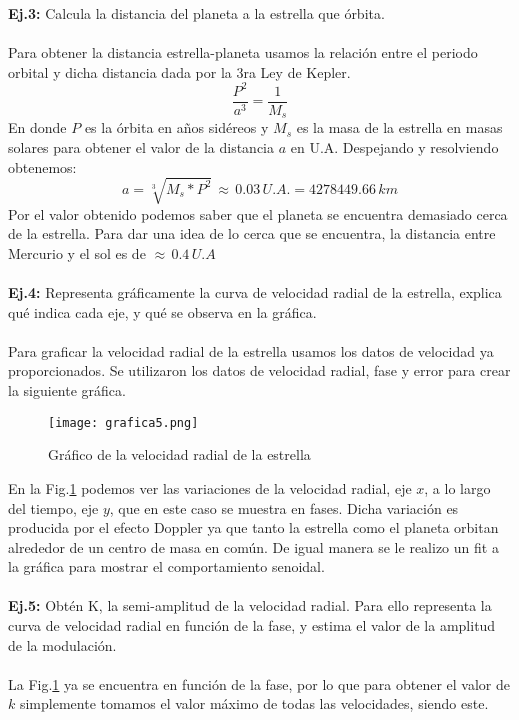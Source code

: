 \documentclass[12pt,letterpaper]{article}
\begin{document}
\textbf{Ej.3:} Calcula la distancia del planeta a la estrella que órbita.\\\\
Para obtener la distancia estrella-planeta usamos la relación entre el periodo orbital y dicha distancia dada por la 3ra Ley de Kepler.
\begin{equation}
\frac{P^2}{a^3}=\frac{1}{M_s}
\end{equation}
En donde $P$ es la órbita en años sidéreos y $M_s$ es la masa de la estrella en masas solares para obtener el valor de la distancia $a$ en U.A. Despejando y resolviendo obtenemos:
\begin{equation}
a=\sqrt[3]{M_s*P^2}\,{\approx}\,0.03\,U.A.= 4278449.66\,km
\end{equation}
Por el valor obtenido podemos saber que el planeta se encuentra demasiado cerca de la estrella. Para dar una idea de lo cerca que se encuentra, la distancia entre Mercurio y el sol es de ${\approx}\,0.4\,U.A$\\\\
\textbf{Ej.4:} Representa gráficamente la curva de velocidad radial de la estrella, explica qué indica cada eje, y qué se observa en la gráfica.\\\\
Para graficar la velocidad radial de la estrella usamos los datos de velocidad ya proporcionados. Se utilizaron los datos de velocidad radial, fase y error para crear la siguiente gráfica.
\begin{figure}[H]
\centering
\texttt{[image: grafica5.png]}
\caption{Gráfico de la velocidad radial de la estrella}
\label{fig:vr}
\end{figure} 
En la Fig.\ref{fig:vr} podemos ver las variaciones de la velocidad radial, eje $x$, a lo largo del tiempo, eje $y$, que en este caso se muestra en fases. Dicha variación es producida por el efecto Doppler ya que tanto la estrella como el planeta orbitan alrededor de un centro de masa en común. De igual manera se le realizo un fit a la gráfica para mostrar el comportamiento senoidal.\\\\
\textbf{Ej.5:} Obtén K, la semi-amplitud de la velocidad radial. Para ello representa la curva de velocidad radial en función de la fase, y estima el valor de la amplitud de la modulación.\\\\
La Fig.\ref{fig:vr} ya se encuentra en función de la fase, por lo que para obtener el valor de $k$ simplemente tomamos el valor máximo de todas las velocidades, siendo este.
\end{document}
